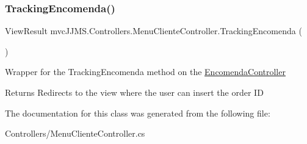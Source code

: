 \subsubsection{\texorpdfstring{Tracking\+Encomenda()}{TrackingEncomenda()}}
{\footnotesize\ttfamily View\+Result mvc\+J\+J\+M\+S.\+Controllers.\+Menu\+Cliente\+Controller.\+Tracking\+Encomenda (\begin{DoxyParamCaption}{ }\end{DoxyParamCaption})\hspace{0.3cm}{\ttfamily [inline]}}



Wrapper for the Tracking\+Encomenda method on the \mbox{\hyperlink{classmvc_j_j_m_s_1_1_controllers_1_1_encomenda_controller}{Encomenda\+Controller}} 

\begin{DoxyReturn}{Returns}
Redirects to the view where the user can insert the order ID
\end{DoxyReturn}


The documentation for this class was generated from the following file\+:\begin{DoxyCompactItemize}
\item 
Controllers/Menu\+Cliente\+Controller.\+cs\end{DoxyCompactItemize}
